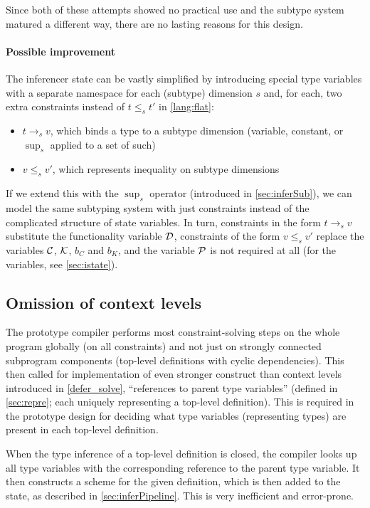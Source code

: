 Since both of these attempts showed no practical use and the subtype system matured a different way, there are no lasting reasons for this design.

\paragraph{Possible improvement} The inferencer state can be vastly simplified by introducing special type variables with a separate namespace for each (subtype) dimension $s$ and, for each, two extra constraints instead of $t \leq_s t'$ in \cref{lang:flat}:

\begin{itemize}
    \item $t \to_s v$, which binds a type to a subtype dimension (variable, constant, or $\sup_s$ applied to a set of such)
    \item $v \leq_s v'$, which represents inequality on subtype dimensions
\end{itemize}

If we extend this with the $\sup_s$ operator (introduced in \cref{sec:inferSub}), we can model the same subtyping system with just constraints instead of the complicated structure of state variables. In turn, constraints in the form $t \to_s v$ substitute the functionality variable $\mathcal D$, constraints of the form $v \leq_s v'$ replace the variables $\mathcal C$, $\mathcal K$, $b_C$ and $b_K$, and the variable $\mathcal P$ is not required at all (for the variables, see \cref{sec:istate}).

\subsection{Omission of context levels}
\label{sec:global}

The prototype compiler performs most constraint-solving steps on the whole program globally (on all constraints) and not just on strongly connected subprogram components (top-level definitions with cyclic dependencies). This then called for implementation of even stronger construct than context levels introduced in \cref{defer_solve}, ``references to parent type variables'' (defined in \cref{sec:repre}; each uniquely representing a top-level definition). This is required in the prototype design for deciding what type variables (representing types) are present in each top-level definition.

When the type inference of a top-level definition is closed, the compiler looks up all type variables with the corresponding reference to the parent type variable. It then constructs a scheme for the given definition, which is then added to the state, as described in \cref{sec:inferPipeline}. This is very inefficient and error-prone.


